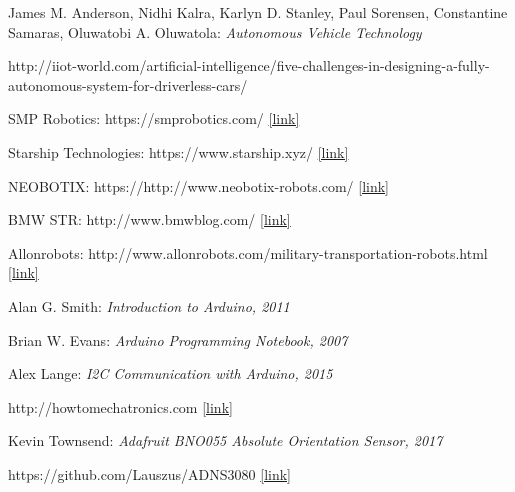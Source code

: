 \documentclass[12pt,english]{article}
\begin{document}
\newpage
\begin{thebibliography}{1}


James M. Anderson, Nidhi Kalra, Karlyn D. Stanley, Paul Sorensen, Constantine Samaras, Oluwatobi A. Oluwatola: \emph{Autonomous Vehicle Technology}

http://iiot-world.com/artificial-intelligence/five-challenges-in-designing-a-fully-autonomous-system-for-driverless-cars/

SMP Robotics: https://smprobotics.com/ \href{https://smprobotics.com/application_autonomus_mobile_robots/transport-robots/}{[link]}

Starship Technologies: https://www.starship.xyz/ \href{https://www.starship.xyz/}{[link]}

NEOBOTIX: https://http://www.neobotix-robots.com/ \href{http://www.neobotix-robots.com/}{[link]}

BMW STR: http://www.bmwblog.com/ \href{http://www.bmwblog.com/2016/11/18/bmw-logistics-now-use-autonomous-transport-robots/}{[link]}

Allonrobots: http://www.allonrobots.com/military-transportation-robots.html \href{http://www.allonrobots.com/military-transportation-robots.html}{[link]}



 Alan G. Smith: \emph{Introduction to Arduino, 2011}


 Brian W. Evans: \emph{Arduino Programming Notebook, 2007}


 Alex Lange: \emph{I2C Communication with Arduino, 2015}

 http://howtomechatronics.com \href{http://howtomechatronics.com/}{[link]}

	 Kevin Townsend: \emph{Adafruit BNO055 Absolute Orientation Sensor, 2017}

	 https://github.com/Lauszus/ADNS3080 \href{https://github.com/Lauszus/ADNS3080}{[link]}
	
\end{thebibliography}
\end{document}
